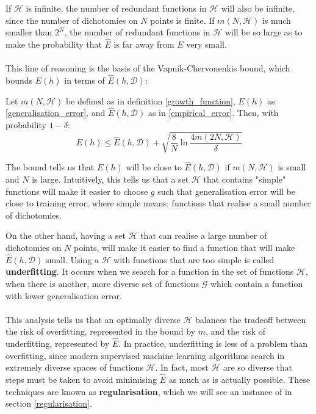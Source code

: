 If $\mathcal{H}$ is infinite, the number of redundant functions in $\mathcal{H}$ will also be infinite, since the number of dichotomies on $N$ points is finite. If $m(N, \mathcal{H})$ is much smaller than $2^N$, the number of redundant functions in $\mathcal{H}$ will be so large as to make the probability that $\hat{E}$ is far away from $E$ very small.
\\\\
 This line of reasoning is the basis of the Vapnik-Chervonenkis bound, which bounds $E(h)$ in terms of $\hat{E}(h, \mathcal{D})$:

\begin{theorem}
	\label{vc_bound}
	Let $m(N, \mathcal{H})$ be defined as in definition \ref{growth_function}, $E(h)$ as \ref{generalisation_error}, and $\hat{E}(h, \mathcal{D})$ as in \ref{empirical_error}. Then, with probability $1 - \delta$:
	$$
	E(h) \leq \hat{E}(h, \mathcal{D}) + \sqrt{\frac{8}{N}\ln \frac{4m(2N, \mathcal{H})}{\delta}}
	$$
\end{theorem}
The bound tells us that $E(h)$ will be close to $\hat{E}(h, \mathcal{D})$ if $m(N, \mathcal{H})$ is small and $N$ is large. Intuitively, this tells us that a set $\mathcal{H}$ that contains "simple" functions will make it easier to choose $g$ such that generalisation error will be close to training error, where simple means: functions that realise a small number of dichotomies.

On the other hand, having a set $\mathcal{H}$ that can realise a large number of dichotomies on $N$ points, will make it easier to find a function that will make $\hat{E}(h, \mathcal{D})$ small. Using a $\mathcal{H}$ with functions that are too simple is called \textbf{underfitting}. It occurs when we search for a function in the set of functions $\mathcal{H}$, when there is another, more diverse set of functions $\mathcal{G}$ which contain a function with lower generalisation error.
\\\\
This analysis tells us that an optimally diverse $\mathcal{H}$ balances the tradeoff between the risk of overfitting, represented in the bound by $m$, and the risk of underfitting, represented by $\hat{E}$. In practice, underfitting is less of a problem than overfitting, since modern supervised machine learning algorithms search in extremely diverse spaces of functions $\mathcal{H}$. In fact, most $\mathcal{H}$ are so diverse that steps must be taken to avoid minimising $\hat{E}$ as much as is actually possible. These techniques are known as \textbf{regularisation}, which we will see an instance of in section \ref{regularisation}.

